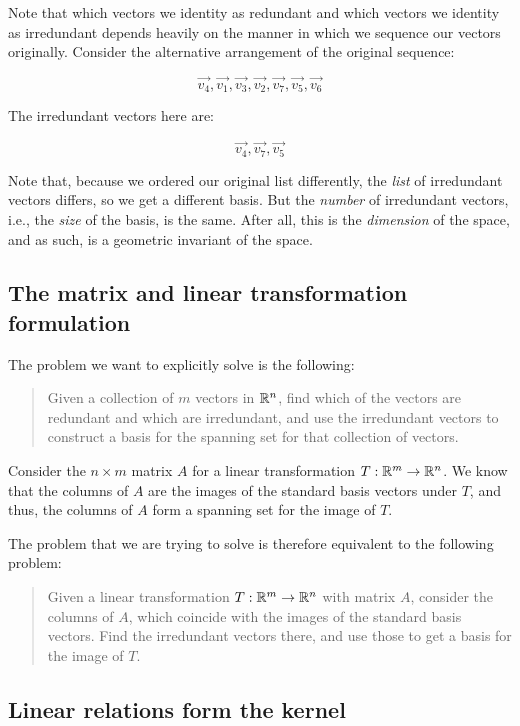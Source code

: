\documentclass[10pt]{amsart}
\begin{document}
Note that which vectors we identity as redundant and which vectors we
identity as irredundant depends heavily on the manner in which we
sequence our vectors originally. Consider the alternative arrangement
of the original sequence:

$$\vec{v_4}, \vec{v_1}, \vec{v_3}, \vec{v_2}, \vec{v_7}, \vec{v_5}, \vec{v_6}$$

The irredundant vectors here are:

$$\vec{v_4},\vec{v_7},\vec{v_5}$$

Note that, because we ordered our original list differently, the {\em
  list} of irredundant vectors differs, so we get a different
basis. But the {\em number} of irredundant vectors, i.e., the {\em
  size} of the basis, is the same. After all, this is the {\em
  dimension} of the space, and as such, is a geometric invariant of
the space.
\subsection{The matrix and linear transformation formulation}

The problem we want to explicitly solve is the following:

\begin{quote}
  Given a collection of $m$ vectors in $\mathbb{R}^n$, find which of the
  vectors are redundant and which are irredundant, and use the
  irredundant vectors to construct a basis for the spanning set for
  that collection of vectors.
\end{quote}

Consider the $n \times m$ matrix $A$ for a linear transformation
$T:\mathbb{R}^m \to \mathbb{R}^n$. We know that the columns of $A$ are the images of
the standard basis vectors under $T$, and thus, the columns of $A$
form a spanning set for the image of $T$.

The problem that we are trying to solve is therefore equivalent to the
following problem:

\begin{quote}
  Given a linear transformation $T:\mathbb{R}^m \to \mathbb{R}^n$ with matrix $A$,
  consider the columns of $A$, which coincide with the images of the
  standard basis vectors. Find the irredundant vectors there, and use
  those to get a basis for the image of $T$.
\end{quote}

\subsection{Linear relations form the kernel}
\end{document}
